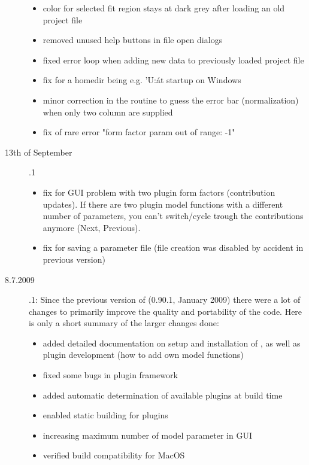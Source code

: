 \begin{description}
\begin{itemize}
          \item color for selected fit region stays at dark grey after loading an old project file
          \item removed unused help buttons in file open dialogs
          \item fixed error loop when adding new data to previously loaded project file
          \item fix for a homedir being e.g. 'U:\' at startup on Windows
          \item minor correction in the routine to guess the error bar (normalization) when only two column are supplied
          \item fix of rare error "form factor param out of range: -1"
        \end{itemize}
    \item[13th of September] .1
        \begin{itemize}
          \item fix for GUI problem with two plugin form factors (contribution updates).
                If there are two plugin model functions with a different number of parameters,
                you can't switch/cycle trough the contributions anymore (Next, Previous).
          \item fix for saving a parameter file (file creation was disabled by accident in previous version)
        \end{itemize}
        \item[8.7.2009] .1: Since the previous version of
                    \SASfit (0.90.1, January 2009) there were a lot of changes to
                    primarily improve the quality and portability of the code. Here is
                    only a short summary of the larger changes done:
        \begin{itemize}
            \item added detailed documentation on setup and installation of \SASfit,
                  as well as plugin development (how to add own model functions)
            \item fixed some bugs in plugin framework
            \item added automatic determination of available plugins at build time
            \item enabled static building for plugins
            \item increasing maximum number of model parameter in GUI
            \item verified build compatibility for MacOS

\end{itemize}
\end{description}
